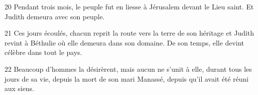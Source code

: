 20 Pendant trois mois, le peuple fut en liesse à Jérusalem devant le Lieu saint. Et Judith demeura avec son peuple.

21 Ces jours écoulés, chacun reprit la route vers la terre de son héritage et Judith revint à Béthulie où elle demeura dans son domaine. De son temps, elle devint célèbre dans tout le pays.

22 Beaucoup d'hommes la désirèrent, mais aucun ne s'unit à elle, durant tous les jours de sa vie, depuis la mort de son mari Manassé, depuis qu'il avait été réuni aux siens.
